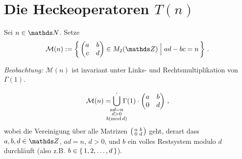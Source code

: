 \section{Die Heckeoperatoren $T(n)$}

\begin{defi}\label{defiM(n)}
Sei $n \in \NN$. Setze 
\[
\mathcal M(n) := \Set{ \abcd \in M_2(\ZZ) \Bigm| ad - bc = n }
\,.
\]
\end{defi}

\emph{Beobachtung:} $\mathcal M(n)$ ist invariant unter Links- und Rechtsmultiplikation von $\Gamma (1)$. 

\begin{lemm}\label{lemma:Mn_schoen}
\[
\mathcal M (n) = \smashoperator{\bigcup_{\substack{ad = n\\ d > 0\\b (\operatorname{mod} d)}}^{\boldsymbol{\cdot}}} \, \Gamma(1) \cdot 
\begin{pmatrix}
a & b\\
0 & d
\end{pmatrix}
\,,
\]
wobei die Vereinigung über alle Matrizen $\mymat ab0d$ geht, derart dass $a,b,d \in \ZZ$, $ad = n$, $d > 0$, und $b$ ein volles Restsystem modulo $d$ durchläuft (also z.B. $b \in \left\{\,1, 2, \ldots, d\,\right\}$).
\end{lemm}

